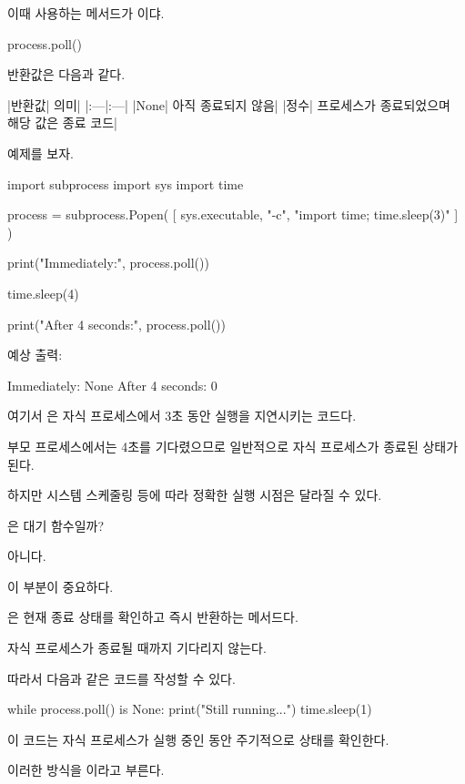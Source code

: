 이때 사용하는 메서드가 이댜.

\begin{dhkzsh}
process.poll()
\end{dhkzsh}

반환값은 다음과 같다.

\begin{dhktable}
|반환값|	의미|
|:---|:---|
|None|	아직 종료되지 않음|
|정수|	프로세스가 종료되었으며 해당 값은 종료 코드|
\end{dhktable}

예제를 보자.

\begin{dhkcode}
import subprocess
import sys
import time

process = subprocess.Popen(
    [
        sys.executable,
        "-c",
        "import time; time.sleep(3)"
    ]
)

print("Immediately:", process.poll())

time.sleep(4)

print("After 4 seconds:", process.poll())
\end{dhkcode}

예상 출력:

\begin{dhkzsh}
Immediately: None
After 4 seconds: 0
\end{dhkzsh}

여기서 은 자식 프로세스에서 3초 동안 실행을 지연시키는 코드다.

부모 프로세스에서는 4초를 기다렸으므로 일반적으로 자식 프로세스가 종료된 상태가 된다.

하지만 시스템 스케줄링 등에 따라 정확한 실행 시점은 달라질 수 있다.

은 대기 함수일까?

아니다.

이 부분이 중요하다.

은 현재 종료 상태를 확인하고 즉시 반환하는 메서드다.

자식 프로세스가 종료될 때까지 기다리지 않는다.

따라서 다음과 같은 코드를 작성할 수 있다.

\begin{dhkcode}
while process.poll() is None:
    print("Still running...")
    time.sleep(1)
\end{dhkcode}

이 코드는 자식 프로세스가 실행 중인 동안 주기적으로 상태를 확인한다.

이러한 방식을 이라고 부른다.

